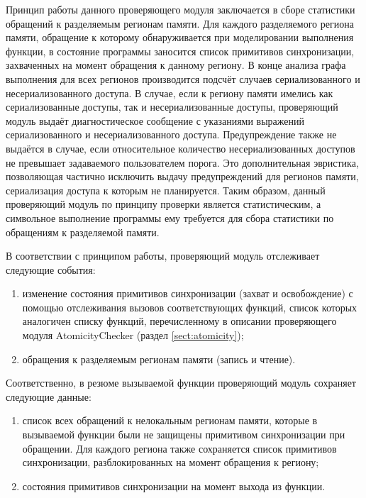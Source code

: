Принцип работы данного проверяющего модуля заключается в сборе статистики обращений к разделяемым регионам памяти. Для каждого разделяемого региона памяти, обращение к которому обнаруживается при моделировании выполнения функции, в состояние программы заносится список примитивов синхронизации, захваченных на момент обращения к данному региону. В конце анализа графа выполнения для всех регионов производится подсчёт случаев сериализованного и несериализованного доступа. В случае, если к региону памяти имелись как сериализованные доступы, так и несериализованные доступы, проверяющий модуль выдаёт диагностическое сообщение с указаниями выражений сериализованного и несериализованного доступа. Предупреждение также не выдаётся в случае, если относительное количество несериализованных доступов не превышает задаваемого пользователем порога. Это дополнительная эвристика, позволяющая частично исключить выдачу предупреждений для регионов памяти, сериализация доступа к которым не планируется. Таким образом, данный проверяющий модуль по принципу проверки является статистическим, а символьное выполнение программы ему требуется для сбора статистики по обращениям к разделяемой памяти.

В соответствии с принципом работы, проверяющий модуль отслеживает следующие события:

\begin{enumerate}
 \item изменение состояния примитивов синхронизации (захват и освобождение) с помощью отслеживания вызовов соответствующих функций, список которых аналогичен списку функций, перечисленному в описании проверяющего модуля AtomicityChecker (раздел \ref{sect:atomicity});
 \item обращения к разделяемым регионам памяти (запись и чтение).
\end{enumerate}

Соответственно, в резюме вызываемой функции проверяющий модуль сохраняет следующие данные:

\begin{enumerate}
 \item список всех обращений к нелокальным регионам памяти, которые в вызываемой функции были не защищены примитивом синхронизации при обращении. Для каждого региона также сохраняется список примитивов синхронизации, разблокированных на момент обращения к региону;
 \item состояния примитивов синхронизации на момент выхода из функции.
\end{enumerate}

